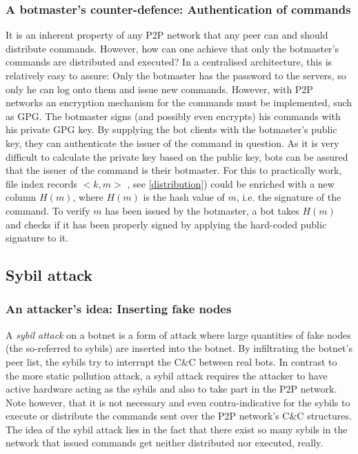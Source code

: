 \documentclass{llncs}
\begin{document}
\subsubsection{A botmaster's counter-defence: Authentication of commands}
It is an inherent property of any P2P network that any peer can and
should distribute commands. However, how can one achieve that only the
botmaster's commands are distributed and executed? In a centralised
architecture, this is relatively easy to assure: Only the botmaster
has the password to the servers, so only he can log onto them and
issue new commands. However, with P2P networks an encryption mechanism
for the commands must be implemented, such as GPG\cite{GPG}. The
botmaster signs (and possibly even encrypts) his commands with his
private GPG key. By supplying the bot clients with the botmaster's
public key, they can authenticate the issuer of the command in
question. As it is very difficult to calculate the private key based
on the public key, bots can be assured that the issuer of the command
is their botmaster. For this to practically work, file index records
$<k, m>$ , see \ref{distribution}) could be enriched with a new column
$H(m)$, where $H(m)$ is the hash value of $m$, i.e. the signature of
the command.\cite{wang2009systematic} To verify $m$ has been issued by
the botmaster, a bot takes $H(m)$ and checks if it has been properly
signed by applying the hard-coded public signature to it.


\subsection{Sybil attack}
\subsubsection{An attacker's idea: Inserting fake nodes}
A {\it sybil attack} on a botnet is a form of attack where large
quantities of fake nodes (the so-referred to sybils) are inserted into
the botnet. By infiltrating the botnet's peer list, the sybils try to
interrupt the C\&C between real bots. In contrast to the more static
pollution attack, a sybil attack requires the attacker to have active
hardware acting as the sybils and also to take part in the P2P
network. Note however, that it is not necessary and even
contra-indicative for the sybils to execute or distribute the commands
sent over the P2P network's C\&C structures. The idea of the sybil
attack lies in the fact that there exist so many sybils in the network
that issued commands get neither distributed nor executed,
really. \cite{davis2008sybil}
\end{document}
